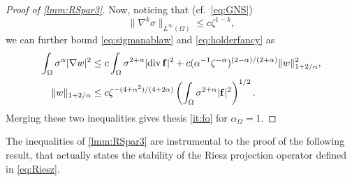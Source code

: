 \documentclass[final,hidelinks]{siamart1116Arxiv}
\numberwithin{theorem}{section}
\newcommand{\Div}{{\rm div}\,}
\begin{document}
\begin{proof}[Proof of \cref{lmm:RSpar3}]
 Now, noticing that (cf.~\cref{eq:GNS})
 \begin{equation}\label{eq:nablaksigmalambda}
  \|\nabla^k\sigma\|_{L^\infty(\Omega)} \leq c\zeta^{1-k},
 \end{equation}
 we can further bound \cref{eq:sigmanablaw} and \cref{eq:holderfancy} as
 \begin{align}
  \int_\Omega\sigma^\alpha|\nabla w|^2 &\leq c\int_\Omega\sigma^{2+\alpha}|\Div\mathbf f|^2 + c(\alpha^{-1}\zeta^{-\alpha})^{(2-\alpha)/(2+\alpha)}\|w\|_{1+2/\alpha}^2,\\
  \|w\|_{1+2/\alpha} &\leq c\zeta^{-(4+\alpha^2)/(4+2\alpha)}\left(\int_\Omega\sigma^{2+\alpha}|\mathbf f|^2\right)^{1/2}.
 \end{align}
 Merging these two inequalities gives thesis \ref{it:fo} for $\alpha_\Omega=1$.
\end{proof}

The inequalities of \cref{lmm:RSpar3} are instrumental to the proof of the following result, that actually states the stability of the Riesz projection operator defined in \cref{eq:Riesz}.
\end{document}
